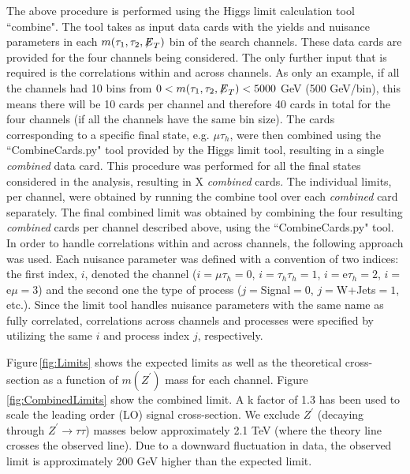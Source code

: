 The above procedure is performed using the Higgs limit calculation tool ``combine"\cite{HiggsCombine}. The tool takes as input data cards with the yields and nuisance parameters in 
each $m(\tau_{1},\tau_{2},{\not\mathrel{E}}_T)$ bin of the search channels. These data cards are provided for the four channels being considered. The only further input that 
is required is the correlations within and across channels. As only an example, if all the channels had 10 bins from $0 < m(\tau_{1},\tau_{2},{\not\mathrel{E}}_T) < 5000$ GeV 
(500 GeV/bin), this means there will be 10 cards per channel and therefore 40 cards in total for the four channels (if all the channels have the same bin size).
The cards corresponding to a specific final state, e.g. $\mu\tau_{h}$, were then combined using the ``CombineCards.py" tool provided by the Higgs limit tool, 
resulting in a single \textit{combined} data card. This procedure was performed for all the final states considered in the analysis, resulting in 
X \textit{combined} cards. The individual limits, per channel, were obtained by running the combine tool over each \textit{combined} card separately. The final 
combined limit was obtained by combining the four resulting \textit{combined} cards per channel described above, using the ``CombineCards.py" tool. In order to 
handle correlations within and across channels, the following approach was used. Each nuisance parameter was defined with a convention of two indices: the first 
index, $i$, denoted the channel ($i=\mu\tau_{h}=0$, $i=\tau_{h}\tau_{h}=1$, $i=$e$\tau_{h}=2$, $i=$e$\mu=3$) and the second one the type of process 
($j=$Signal$=0$, $j=$W+Jets$=1$, etc.). Since the limit tool handles nuisance parameters with the same name as fully correlated, correlations across channels and 
processes were specified by utilizing the same $i$ and process index $j$, respectively.

Figure\,\ref{fig:Limits} shows the expected limits as well as the theoretical cross-section as a function of $m(Z^{\prime})$ mass for each channel. 
Figure\,\ref{fig:CombinedLimits} show the combined limit. A k factor of 1.3 has been used to scale the leading order (LO) signal cross-section. 
We exclude $Z^{\prime}$ (decaying through $Z^{\prime}\to\tau\tau$) masses below approximately 2.1 TeV (where the theory line crosses the observed line). Due to a downward fluctuation in data, the observed limit is approximately 200 GeV higher than the expected limit.

